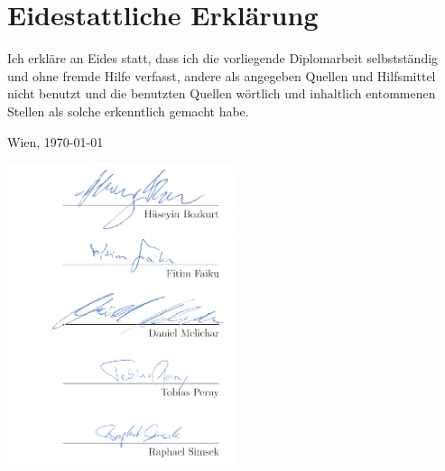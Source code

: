 \section*{Eidestattliche Erklärung}
Ich erkläre an Eides statt, dass ich die vorliegende Diplomarbeit selbstständig und ohne fremde Hilfe verfasst, andere als angegeben Quellen und Hilfsmittel nicht benutzt und die benutzten Quellen wörtlich und inhaltlich entommenen Stellen als solche erkenntlich gemacht habe.

\vspace{0.5cm}

Wien, \today

\vspace{1.5cm}

\includegraphics[width=0.5\textwidth, right]{special/eides}
